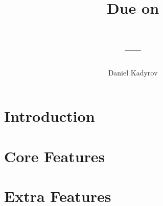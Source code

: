 \documentclass{homework}
\title{
    \Title \\
    \vspace{2mm}
    \large
    Due on \DueDate \\
    \ClassName \\ 
    \ClassNumber ---\ClassSection \\
    \Instructor
}
\author{Daniel Kadyrov}
\date{}
\begin{document}
\maketitle
\thispagestyle{empty}

\section{Introduction}

\section{Core Features}

\section{Extra Features}
\end{document}
